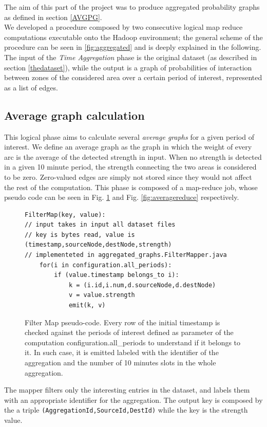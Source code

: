 The aim of this part of the project was to produce aggregated probability graphs as defined in section \ref{AVGPG}.
\\ 
We developed a procedure composed by two consecutive logical map reduce computations executable onto the Hadoop environment; the general scheme of the procedure can be seen in \ref{fig:aggregated} and is deeply explained in the following.
The input of the \emph{Time Aggregation} phase is the original dataset (as described in section \ref{thedataset}), while the output is a graph of probabilities of interaction between zones of the considered area
over a certain period of interest, represented as a list of edges.
\subsection{Average graph calculation}
This logical phase aims to calculate several \emph{average graphs} for a given period of interest.
We define an average graph as the graph in which the weight of every arc is the average of the detected strength in input. When no strength is detected in a given 10 minute period, the strength connecting the two areas is considered to be zero. Zero-valued
edges are simply not stored since they would not affect the rest of the computation.
This phase is composed of a map-reduce job, whose pseudo code can be seen in Fig. \ref{fig:filtermap} and Fig. \ref{fig:averagereduce} respectively.
\begin{figure}[H]
\begin{verbatim}
FilterMap(key, value):
// input takes in input all dataset files
// key is bytes read, value is (timestamp,sourceNode,destNode,strength)
// implementeted in aggregated_graphs.FilterMapper.java
    for(i in configuration.all_periods):
        if (value.timestamp belongs_to i):
  	        k = (i.id,i.num,d.sourceNode,d.destNode)
  	        v = value.strength
            emit(k, v)

\end{verbatim}
\caption{Filter Map pseudo-code. Every row of the initial timestamp is checked against the periods of interest defined
as parameter of the computation configuration.all\_periods to understand if it belongs to it. In such case, it
is emitted labeled with the identifier of the aggregation and the number of 10 minutes slots in the whole aggregation.}
\label{fig:filtermap}
\end{figure}
The mapper filters only the interesting entries in the dataset, and labels them with an appropriate identifier for the aggregation. The output key is composed by the  a triple \texttt{(AggregationId,SourceId,DestId)} while the key is the strength value.\\
